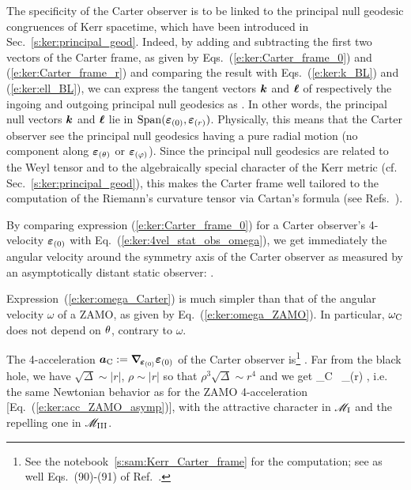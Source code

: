The specificity of the Carter observer is to be linked to the principal null geodesic congruences
of Kerr spacetime, which have been introduced in Sec.~\ref{s:ker:principal_geod}.
Indeed, by adding and subtracting
the first two vectors of the Carter frame, as given by
Eqs.~(\ref{e:ker:Carter_frame_0}) and (\ref{e:ker:Carter_frame_r}) and comparing
the result with Eqs.~(\ref{e:ker:k_BL}) and (\ref{e:ker:ell_BL}), we can
express the tangent vectors $\bm{k}$ and $\bm{\ell}$ of respectively the ingoing and outgoing principal
null geodesics as
\be \label{e:ker:k_l_Carter}
    \qand
     .
\ee
In other words, the principal null vectors $\bm{k}$ and $\bm{\ell}$ lie in
$\mathrm{Span}(\bm{\varepsilon}_{(0)}, \bm{\varepsilon}_{(r)})$. Physically, this means that
the Carter observer see the principal null geodesics having a pure radial motion
(no component along $\bm{\varepsilon}_{(\theta)}$ or $\bm{\varepsilon}_{(\varphi)}$).
Since the principal null geodesics are related to the Weyl tensor
and to the algebraically special character of the Kerr metric (cf. Sec.~\ref{s:ker:principal_geod}),
this makes the Carter frame well tailored to the computation of the Riemann's curvature tensor
via Cartan's formula (see Refs.~\cite{Carte73a,ONeil95}).

By comparing expression (\ref{e:ker:Carter_frame_0}) for a Carter observer's 4-velocity
$\bm{\varepsilon}_{(0)}$ with Eq.~(\ref{e:ker:4vel_stat_obs_omega}), we get immediately the
angular velocity around the symmetry axis of the Carter observer
as measured by an asymptotically distant static observer:
\be \label{e:ker:omega_Carter}
     .
\ee

\begin{remark}
Expression~(\ref{e:ker:omega_Carter}) is much simpler than that of the angular velocity $\omega$ of a ZAMO, as given
by Eq.~(\ref{e:ker:omega_ZAMO}). In particular, $\omega_{\rm C}$ does not depend on $\theta$,
contrary to $\omega$.
\end{remark}

The 4-acceleration $\bm{a}_{\rm C} := \bm{\nabla}_{\!\bm{\varepsilon}_{(0)}} \bm{\varepsilon}_{(0)}$ of the Carter observer is\footnote{See the notebook~\ref{s:sam:Kerr_Carter_frame} for the computation; see as well Eqs.~(90)-(91) of Ref.~\cite{Semer93}.}
\be \label{e:ker:acc_Carter}
   .
\ee
Far from the black hole, we have $\sqrt{\Delta} \sim |r|$, $\rho\sim |r|$ so that
$\rho^3\sqrt{\Delta} \sim r^4$ and we get
\be \label{e:ker:acc_Carter_asymp}
    _{\rm C}  \, \w{\veps}_{(r)} ,
\ee
i.e. the same Newtonian behavior as for the ZAMO 4-acceleration [Eq.~(\ref{e:ker:acc_ZAMO_asymp})],
with the attractive character in $\mathscr{M}_{\rm I}$ and the repelling one in $\mathscr{M}_{\rm III}$.

